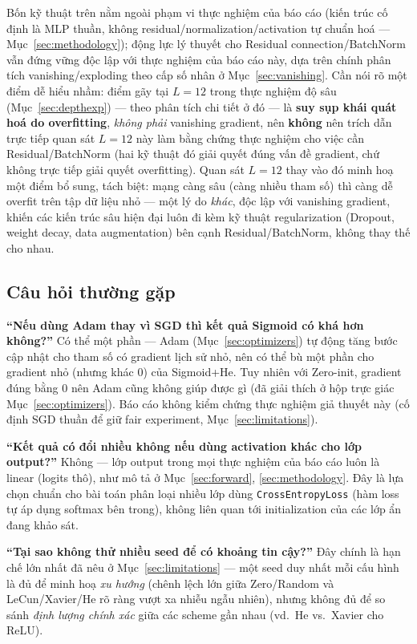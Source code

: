 \documentclass[12pt,a4paper]{article}
\begin{document}
Bốn kỹ thuật trên nằm ngoài phạm vi thực nghiệm của báo cáo (kiến trúc cố
định là MLP thuần, không residual/normalization/activation tự chuẩn hoá
--- Mục~\ref{sec:methodology}); động lực lý thuyết cho Residual
connection/BatchNorm vẫn đứng vững độc lập với thực nghiệm của báo cáo
này, dựa trên chính phân tích vanishing/exploding theo cấp số nhân ở
Mục~\ref{sec:vanishing}. Cần nói rõ một điểm dễ hiểu nhầm: điểm gãy tại
$L{=}12$ trong thực nghiệm độ sâu (Mục~\ref{sec:depthexp}) --- theo phân
tích chi tiết ở đó --- là \textbf{suy sụp khái quát hoá do overfitting},
\emph{không phải} vanishing gradient, nên \textbf{không} nên trích dẫn
trực tiếp quan sát $L{=}12$ này làm bằng chứng thực nghiệm cho việc cần
Residual/BatchNorm (hai kỹ thuật đó giải quyết đúng vấn đề gradient, chứ
không trực tiếp giải quyết overfitting). Quan sát $L{=}12$ thay vào đó
minh hoạ một điểm bổ sung, tách biệt: mạng càng sâu (càng nhiều tham số)
thì càng dễ overfit trên tập dữ liệu nhỏ --- một lý do \emph{khác}, độc
lập với vanishing gradient, khiến các kiến trúc sâu hiện đại luôn đi kèm
kỹ thuật regularization (Dropout, weight decay, data augmentation) bên
cạnh Residual/BatchNorm, không thay thế cho nhau.

\subsection{Câu hỏi thường gặp}

\textbf{``Nếu dùng Adam thay vì SGD thì kết quả Sigmoid có khá hơn
không?''} Có thể một phần --- Adam (Mục~\ref{sec:optimizers}) tự động
tăng bước cập nhật cho tham số có gradient lịch sử nhỏ, nên có thể bù một
phần cho gradient nhỏ (nhưng khác $0$) của Sigmoid+He. Tuy nhiên với
Zero-init, gradient đúng bằng $0$ nên Adam cũng không giúp được gì (đã
giải thích ở hộp trực giác Mục~\ref{sec:optimizers}). Báo cáo không kiểm
chứng thực nghiệm giả thuyết này (cố định SGD thuần để giữ fair
experiment, Mục~\ref{sec:limitations}).

\textbf{``Kết quả có đổi nhiều không nếu dùng activation khác cho lớp
output?''} Không --- lớp output trong mọi thực nghiệm của báo cáo luôn là
linear (logits thô), như mô tả ở Mục~\ref{sec:forward},
\ref{sec:methodology}. Đây là lựa chọn chuẩn cho bài toán phân loại nhiều
lớp dùng \texttt{CrossEntropyLoss} (hàm loss tự áp dụng softmax bên
trong), không liên quan tới initialization của các lớp ẩn đang khảo sát.

\textbf{``Tại sao không thử nhiều seed để có khoảng tin cậy?''} Đây chính
là hạn chế lớn nhất đã nêu ở Mục~\ref{sec:limitations} --- một seed duy
nhất mỗi cấu hình là đủ để minh hoạ \emph{xu hướng} (chênh lệch lớn giữa
Zero/Random và LeCun/Xavier/He rõ ràng vượt xa nhiễu ngẫu nhiên), nhưng
không đủ để so sánh \emph{định lượng chính xác} giữa các scheme gần nhau
(vd.\ He vs.\ Xavier cho ReLU).
\end{document}
